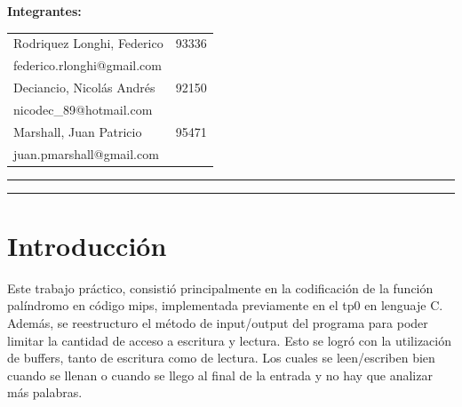 \documentclass[11pt,a4paper]{article}
\newcommand\blankpage{%
	\null
	\thispagestyle{empty}%
	\addtocounter{page}{-1}%
	\newpage}
\begin{document}
\begin{titlepage}
	\begin{flushleft}
	\begin{table}[H]
		\begin{flushleft}
		\textbf{Integrantes:}\\
		\vspace{0.01\textheight}
		\begin{tabular}{l r}
			Rodriquez Longhi, Federico  & 93336\\
			\hspace{0.05\textheight}federico.rlonghi@gmail.com&\\
			Deciancio, Nicolás Andrés   & 92150\\
			\hspace{0.05\textheight}nicodec\_89@hotmail.com&\\
			Marshall, Juan Patricio & 95471\\
			\hspace{0.05\textheight}juan.pmarshall@gmail.com&\\
		\end{tabular}
		\end{flushleft}
	\end{table}
		

	\end{flushleft}
	\vspace{0.05\textheight}
	\vspace{2pt}
	\vfill
	\rule{\textwidth}{1pt}\par %
	\vspace{2pt}\vspace{-\baselineskip} %
	\rule{\textwidth}{0.4pt}\par %
	
\end{titlepage}

\blankpage

\tableofcontents

\newpage

\section{Introducción}

Este trabajo práctico, consistió principalmente en la codificación de la función palíndromo en código mips, implementada previamente en el tp0 en lenguaje C. Además, se reestructuro el método de input/output del programa para poder limitar la cantidad de acceso a escritura y lectura. Esto se logró con la utilización de buffers, tanto de escritura como de lectura. Los cuales se leen/escriben bien cuando se llenan o cuando se llego al final de la entrada y no hay que analizar más palabras.
\end{document}
